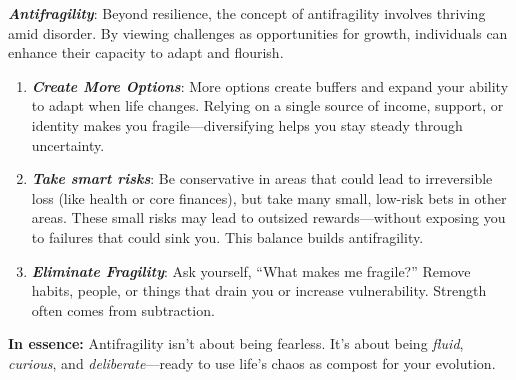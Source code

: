 \textbf{\textit{Antifragility}}: Beyond resilience, the concept of antifragility involves thriving amid disorder. By viewing challenges as opportunities for growth, individuals can enhance their capacity to adapt and flourish.
\begin{enumerate}
    \item \textbf{\textit{Create More Options}}: More options create buffers and expand your ability to adapt when life changes. Relying on a single source of income, support, or identity makes you fragile—diversifying helps you stay steady through uncertainty.
    \item \textbf{\textit{Take smart risks}}: Be conservative in areas that could lead to irreversible loss (like health or core finances), but take many small, low-risk bets in other areas. These small risks may lead to outsized rewards—without exposing you to failures that could sink you. This balance builds antifragility.
    \item \textbf{\textit{Eliminate Fragility}}: Ask yourself, “What makes me fragile?” Remove habits, people, or things that drain you or increase vulnerability. Strength often comes from subtraction.
\end{enumerate}
\textbf{In essence:} Antifragility isn’t about being fearless. It’s about being \textit{fluid}, \textit{curious}, and \textit{deliberate}—ready to use life’s chaos as compost for your evolution.
